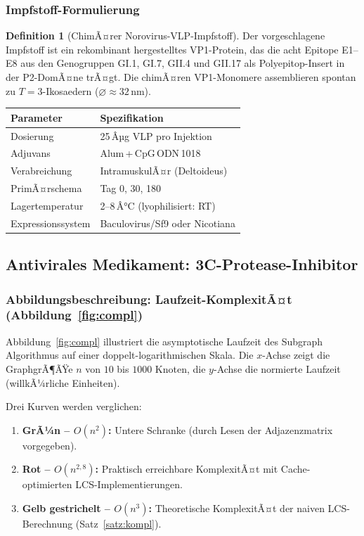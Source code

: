 ﻿\documentclass[a4paper,12pt]{article}
\theoremstyle{plain}
\theoremstyle{definition}
\newtheorem{definition}[satz]{Definition}
\theoremstyle{remark}
\begin{document}
\subsubsection{Impfstoff-Formulierung}

\begin{definition}[ChimÃ¤rer Norovirus-VLP-Impfstoff]
Der vorgeschlagene Impfstoff ist ein rekombinant hergestelltes VP1-Protein, das die
acht Epitope E1--E8 aus den Genogruppen GI.1, GI.7, GII.4 und GII.17 als
Polyepitop-Insert in der P2-DomÃ¤ne trÃ¤gt. Die chimÃ¤ren VP1-Monomere assemblieren
spontan zu $T=3$-Ikosaedern ($\varnothing\approx32\,\text{nm}$).
\end{definition}

\begin{center}
\begin{tabular}{ll}
\toprule
\textbf{Parameter}  & \textbf{Spezifikation} \\
\midrule
Dosierung           & 25\,Âµg VLP pro Injektion \\
Adjuvans            & Alum\,+\,CpG\,ODN\,1018 \\
Verabreichung       & IntramuskulÃ¤r (Deltoideus) \\
PrimÃ¤rschema        & Tag 0, 30, 180 \\
Lagertemperatur     & 2--8\,Â°C (lyophilisiert: RT) \\
Expressionssystem   & Baculovirus/Sf9 oder Nicotiana \\
\bottomrule
\end{tabular}
\end{center}

\subsection{Antivirales Medikament: 3C-Protease-Inhibitor}

\subsubsection{Abbildungsbeschreibung: Laufzeit-KomplexitÃ¤t (Abbildung~\ref{fig:compl})}

Abbildung~\ref{fig:compl} illustriert die asymptotische Laufzeit des Subgraph Algorithmus
auf einer doppelt-logarithmischen Skala. Die $x$-Achse zeigt die GraphgrÃ¶ÃŸe $n$ von
$10$ bis $1000$ Knoten, die $y$-Achse die normierte Laufzeit (willkÃ¼rliche Einheiten).

Drei Kurven werden verglichen:
\begin{enumerate}
  \item \textbf{GrÃ¼n -- $O(n^2)$:} Untere Schranke (durch Lesen der Adjazenzmatrix vorgegeben).
  \item \textbf{Rot -- $O(n^{2{,}8})$:} Praktisch erreichbare KomplexitÃ¤t mit Cache-optimierten
        LCS-Implementierungen.
  \item \textbf{Gelb gestrichelt -- $O(n^3)$:} Theoretische KomplexitÃ¤t der naiven
        LCS-Berechnung (Satz~\ref{satz:kompl}).
\end{enumerate}
\end{document}
